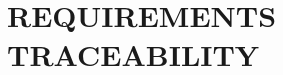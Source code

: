 \chapter{REQUIREMENTS TRACEABILITY}
\label{ch:requirementsTraceability}%
\begin{comment}
{\renewcommand{\arraystretch}{1.5}
\begin{longtable}{|p{0.20\linewidth}p{0.75\linewidth}|}
    \hline
    \rowcolor{bluepoli!40}\textbf{G1} & \textbf{Allow Drivers to check nearby charging stations and see info about their prices, special offers and availability.} \\
    \hline
    \rowcolor{bluepoli!15} FRE1 & An Unregistered Driver shall be able to register himself on the eMSP application. \\
    \hline
    \rowcolor{bluepoli!15} FRE2 & The Driver shall be able to login to the eMSP with his credentials. \\
    \hline 
    \rowcolor{bluepoli!15} FRE3 & The system shall notify the Driver if there is no internet connection. \\
    \hline 
    \rowcolor{bluepoli!15} FRE4 & The Driver shall be able to see the location of all the charging stations in a certain geographic area. \\
    \hline 
    \rowcolor{bluepoli!15} FRE5 & The Driver shall be able to select the charging types he is interested in while searching for a charging station in order to filter them. \\
    \hline 
    \rowcolor{bluepoli!15} FRE6 & The Driver shall be able to check the cost per kWh for the specified charging types in a specific charging station. \\
    \hline  
    \rowcolor{bluepoli!15} FRE7 & The Driver shall be able to see which charging stations are currently available for the specified charging types. \\
    \hline  
    \rowcolor{bluepoli!15} FRE8 & The Driver shall be able to see an estimated time in which a specific charging station will become available. \\
    \hline  
    \rowcolor{bluepoli!15} FRE18 & Every time the system fails to elaborate an operation related to a Driver, then he shall receive a notification containing the error details. \\
    \hline  
    \rowcolor{bluepoli!15} FRE22 & If the vehicle is connected, the system shall be able to retrieve the Driver’s vehicle location \\

\end{comment}

